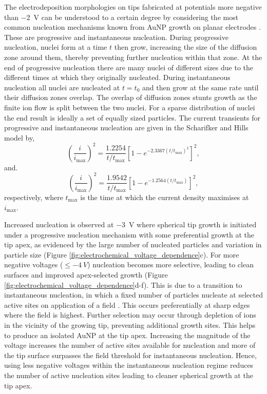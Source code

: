 \documentclass{article}
\begin{document}
The electrodeposition morphologies on tips fabricated at potentials more negative than \SI{-2}{V} can be understood to a certain degree by considering the most common nucleation mechanisms known from AuNP growth on planar electrodes \cite{scharifker1983}. These are progressive and instantaneous nucleation. During progressive nucleation, nuclei form at a time $t$ then grow, increasing the size of the diffusion zone around them, thereby preventing further nucleation within that zone. At the end of progressive nucleation there are many nuclei of different sizes due to the different times at which they originally nucleated. During instantaneous nucleation all nuclei are nucleated at $t=t_0$ and then grow at the same rate until their diffusion zones overlap. The overlap of diffusion zones stunts growth as the finite ion flow is split between the two nuclei. For a sparse distribution of nuclei the end result is ideally a set of equally sized particles. The current transients for progressive and instantaneous nucleation are given in the Scharifker and Hills model by,
\begin{equation}
\left(\frac{i}{i_{\mathrm{max}}}\right)^2 = \frac{1.2254}{t/t_{\mathrm{max}}} \left[ 1 - e^{-2.3367(t/t_{\mathrm{max}})^2} \right]^2,
\label{eq:prog_nucleation}
\end{equation}
and.
\begin{equation}
\left(\frac{i}{i_{\mathrm{max}}}\right)^2 = \frac{1.9542}{t/t_{\mathrm{max}}} \left[ 1 - e^{-1.2564(t/t_{\mathrm{max}})} \right]^2,
\label{eq:inst_nucleation}
\end{equation}
respectively, where $t_{\mathrm{max}}$ is the time at which the current density maximises at $i_{\mathrm{max}}$.

Increased nucleation is observed at \SI{-3}{V} where spherical tip growth is initiated under a progressive nucleation mechanism with some preferential growth at the tip apex, as evidenced by the large number of nucleated particles and variation in particle size (Figure \ref{fig:electrochemical_voltage_dependence}c). For more negative voltages ($\leq \SI{-4}{V}$) nucleation becomes more selective, leading to clean surfaces and improved apex-selected growth (Figure \ref{fig:electrochemical_voltage_dependence}d-f). This is due to a transition to instantaneous nucleation, in which a fixed number of particles nucleate at selected active sites on application of a field \cite{hyde2003}. This occurs preferentially at sharp edges where the field is highest. Further selection may occur through depletion of ions in the vicinity of the growing tip, preventing additional growth sites. This helps to produce an isolated AuNP at the tip apex. Increasing the magnitude of the voltage increases the number of active sites available for nucleation and more of the tip surface surpasses the field threshold for instantaneous nucleation. Hence, using less negative voltages within the instantaneous nucleation regime reduces the number of active nucleation sites leading to cleaner spherical growth at the tip apex.
\end{document}
